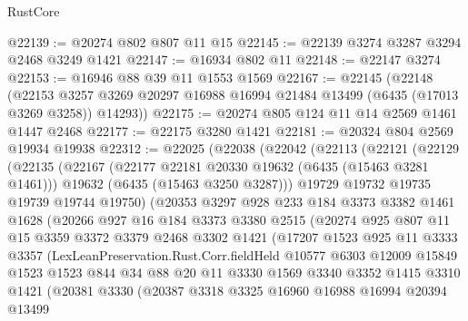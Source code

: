\begin{lexlean}{RustCore}
\begin{coremodule}
@22139 := @20274 @802 @807 @11 @15
@22145 := @22139 @3274 @3287 @3294 @2468 @3249 @1421
@22147 := @16934 @802 @11
@22148 := @22147 @3274
@22153 := @16946 @88 @39 @11 @1553 @1569
@22167 := @22145
    (@22148
      (@22153 @3257 @3269 @20297 @16988 @16994 @21484 @13499 (@6435 (@17013 @3269 @3258)) @14293))
@22175 := @20274 @805 @124 @11 @14 @2569 @1461 @1447 @2468
@22177 := @22175 @3280 @1421
@22181 := @20324 @804 @2569 @19934 @19938
@22312 := @22025
    (@22038
      (@22042
        (@22113
          (@22121
            (@22129
              (@22135
                (@22167
                  (@22177 @22181 @20330 @19632 (@6435 (@15463 @3281 @1461)))
                  @19632
                  (@6435 (@15463 @3250 @3287)))
                @19729
                @19732
                @19735
                @19739
                @19744
                @19750)
              (@20353
                @3297
                @928
                @233
                @184
                @3373
                @3382
                @1461
                @1628
                (@20266
                  @927
                  @16
                  @184
                  @3373
                  @3380
                  @2515
                  (@20274
                    @925
                    @807
                    @11
                    @15
                    @3359
                    @3372
                    @3379
                    @2468
                    @3302
                    @1421
                    (@17207
                      @1523
                      @925
                      @11
                      @3333
                      @3357
                      (LexLeanPreservation.Rust.Corr.fieldHeld
                        @10577
                        @6303
                        @12009
                        @15849
                        @1523
                        @1523
                        @844
                        @34
                        @88
                        @20
                        @11
                        @3330
                        @1569
                        @3340
                        @3352
                        @1415
                        @3310
                        @1421
                        (@20381
                          @3330
                          (@20387
                            @3318
                            @3325
                            @16960
                            @16988
                            @16994
                            @20394
                            @13499

\end{coremodule}
\end{lexlean}
